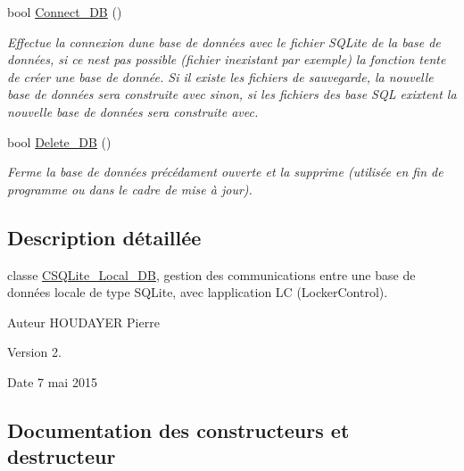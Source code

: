 \begin{DoxyCompactItemize}
bool \hyperlink{class_c_s_q_lite___local___d_b_a9ca65a5a5f4b64892744771cedb1cd45}{Connect\+\_\+\+D\+B} ()
\begin{DoxyCompactList}\small\item\em Effectue la connexion d\textquotesingle{}une base de données avec le fichier S\+Q\+Lite de la base de données, si ce n\textquotesingle{}est pas possible (fichier inexistant par exemple) la fonction tente de créer une base de donnée. Si il existe les fichiers de sauvegarde, la nouvelle base de données sera construite avec sinon, si les fichiers des base S\+Q\+L exixtent la nouvelle base de données sera construite avec. \end{DoxyCompactList}\item 
bool \hyperlink{class_c_s_q_lite___local___d_b_a8222ffaffb0d9945e4343131707b1c22}{Delete\+\_\+\+D\+B} ()
\begin{DoxyCompactList}\small\item\em Ferme la base de données précédament ouverte et la supprime (utilisée en fin de programme ou dans le cadre de mise à jour). \end{DoxyCompactList}\end{DoxyCompactItemize}


\subsection{Description détaillée}
classe \hyperlink{class_c_s_q_lite___local___d_b}{C\+S\+Q\+Lite\+\_\+\+Local\+\_\+\+D\+B}, gestion des communications entre une base de données locale de type S\+Q\+Lite, avec l\textquotesingle{}application L\+C (Locker\+Control). 

\begin{DoxyAuthor}{Auteur}
H\+O\+U\+D\+A\+Y\+E\+R Pierre
\end{DoxyAuthor}
\begin{DoxyVersion}{Version}
2.
\end{DoxyVersion}
\begin{DoxyDate}{Date}
7 mai 2015 
\end{DoxyDate}


\subsection{Documentation des constructeurs et destructeur}
\hypertarget{class_c_s_q_lite___local___d_b_a1de8dfa1437f6ff518b0375017aba25f}{}
